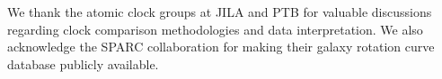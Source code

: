 \documentclass[aps,prd,twocolumn,superscriptaddress,showpacs,floatfix,nofootinbib]{revtex4-2}
\theoremstyle{plain}
\theoremstyle{definition}
\theoremstyle{remark}
\begin{document}
\newpage


\newpage


\newpage


\newpage


\newpage


\newpage





\begin{acknowledgments}
We thank the atomic clock groups at JILA and PTB for valuable discussions regarding clock comparison methodologies and data interpretation. We also acknowledge the SPARC collaboration for making their galaxy rotation curve database publicly available.
\end{acknowledgments}


\end{document}
